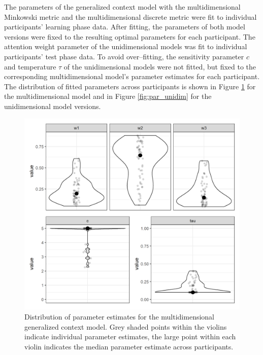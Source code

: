 \documentclass[a4paper,man,natbib]{apa6}
\begin{document}
The parameters of the generalized context model with the multidimensional Minkowski metric and the multidimensional discrete metric were fit to individual participants’ learning phase data. After fitting, the parameters of both model versions were fixed to the resulting optimal parameters for each participant. The attention weight parameter of the unidimensional models was fit to individual participants’ test phase data. To avoid over--fitting, the sensitivity parameter $c$ and temperature $\tau$ of the unidimensional models were not fitted, but fixed to the corresponding multidimensional model’s parameter estimates for each participant. The distribution of fitted parameters across participants is shown in Figure \ref{fig:par_multidim} for the multidimensional model and in Figure \ref{fig:par_unidim} for the unidimensional model versions. 

\begin{figure}
\centering
\includegraphics[width = \textwidth]{fig_par_multidim.png}
\caption{Distribution of parameter estimates for the multidimensional generalized context model. Grey shaded points within the violins indicate individual parameter estimates, the large point within each violin indicates the median parameter estimate across participants.}
\label{fig:par_multidim}
\end{figure}
\end{document}
